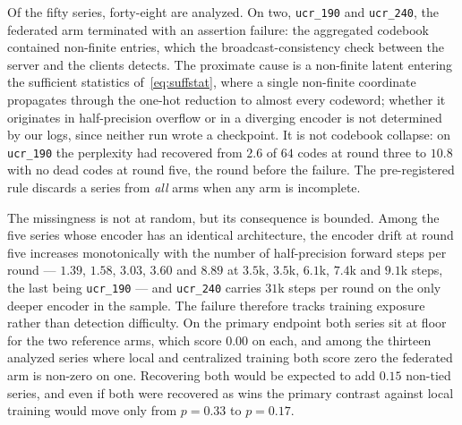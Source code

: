 \documentclass[conference]{IEEEtran}
\begin{document}
Of the fifty series, forty-eight are analyzed. On two, \texttt{ucr\_190} and \texttt{ucr\_240},
the federated arm terminated with an assertion failure: the aggregated codebook contained
non-finite entries, which the broadcast-consistency check between the server and the clients
detects. The proximate cause is a non-finite latent entering the sufficient statistics
of~\eqref{eq:suffstat}, where a single non-finite coordinate propagates through the one-hot
reduction to almost every codeword; whether it originates in half-precision overflow or in a
diverging encoder is not determined by our logs, since neither run wrote a checkpoint. It is not
codebook collapse: on \texttt{ucr\_190} the perplexity had recovered from $2.6$ of $64$ codes at
round three to $10.8$ with no dead codes at round five, the round before the failure. The
pre-registered rule discards a series from \emph{all} arms when any arm is incomplete.

The missingness is not at random, but its consequence is bounded. Among the five series whose
encoder has an identical architecture, the encoder drift at round five increases monotonically with
the number of half-precision forward steps per round --- $1.39$, $1.58$, $3.03$, $3.60$ and $8.89$
at $3.5$k, $3.5$k, $6.1$k, $7.4$k and $9.1$k steps, the last being \texttt{ucr\_190} --- and
\texttt{ucr\_240} carries $31$k steps per round on the only deeper encoder in the sample. The
failure therefore tracks training exposure rather than detection difficulty. On the primary
endpoint both series sit at floor for the two reference arms, which score $0.00$ on each, and among
the thirteen analyzed series where local and centralized training both score zero the federated arm
is non-zero on one. Recovering both would be expected to add $0.15$ non-tied series, and even if
both were recovered as wins the primary contrast against local training would move only from
$p=0.33$ to $p=0.17$.
\end{document}
